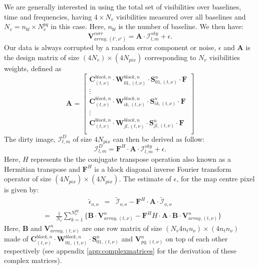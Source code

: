 \documentclass[useAMS,usenatbib]{mn2e}
\begin{document}
We are generally interested in using the total set of visibilities over baselines, time and frequencies, having $4\times N_v$ visibilities 
measured over all baselines  and $N_v=n_{bl}\times N_v^{pq}$ in this case. Here, $n_{bl}$ is the number of baseline. We then have:
\begin{equation}
 \mathbf{V}_{array,(t',\nu')}^{corr}=\mathbf{A}\cdot\mathcal{I}_{l,m}^{sky} + \epsilon. \label{eq:vall}
\end{equation}
Our data is always corrupted by a random error component or noise, $\epsilon$   and $\mathbf{A}$ is the design matrix of size 
$(4N_v)\times (4N_{pix})$ 
corresponding to $N_v$ visibilities weights, defined as
\begin{equation*}
\mathbf{A}_{}=
  \begin{bmatrix}
    \mathbf{C}_{(t,\nu)}^{block,n}\cdot \mathbf{W}_{01,(t,\nu)}^{block,n}\cdot \mathbf{S}_{01,(t,\nu)}^{n} \cdot\mathbf{F}\\
    \vdots\\
    \mathbf{C}_{(t,\nu)}^{block,n}\cdot \mathbf{W}_{ik,(t,\nu)}^{block,n}\cdot \mathbf{S}_{ik,(t,\nu)}^{n} \cdot\mathbf{F}\\
    \vdots \\
    \mathbf{C}_{(t,\nu)}^{block,n}\cdot \mathbf{W}_{jl,(t,\nu)}^{block,n}\cdot \mathbf{S}_{jl,(t,\nu)}^{n} \cdot\mathbf{F}\\
  \end{bmatrix}
\end{equation*}
The dirty image, $\mathcal{I}_{l,m}^{D}$ of size $4N_{pix}$ can then be derived as follow:
\begin{equation}
\mathcal{I}_{l,m}^{D}=\mathbf{F}^{H}\cdot\mathbf{A}\cdot\mathcal{I}_{l,m}^{sky} + \epsilon.
\end{equation}
Here, $H$ represents the the conjugate transpose operation also known as a Hermitian transpose and $\mathbf{F}^{H}$ is a block diagonal
inverse Fourier transform operator of size $(4N_{pix})\times(4N_{pix})$. The estimate of  $\epsilon$, for the map centre pixel is given by:
\begin{eqnarray*}
 \widetilde{\epsilon}_{o,o}&=&\widetilde{\mathcal{I}}_{o,o} - \mathbf{F}^{H}\cdot\mathbf{A}\cdot\widetilde{\mathcal{I}}_{o,o}
\end{eqnarray*}
\begin{eqnarray}
	&=&\frac{1}{N_{v}}\sum_{k=1}^{N_{v}^{pq}}\Bigg\{\mathbf{B}\cdot\mathbf{V}_{array,(t,\nu)}^{n}-
\mathbf{F}^{H}{H}\cdot\mathbf{A}\cdot\mathbf{B}\cdot\mathbf{V}_{array,(t,\nu)}^{n}\Bigg\} \label{eq:noise}
\end{eqnarray}
Here, $\mathbf{B}$ and $\mathbf{V}_{array,(t,\nu)}^{n}$ are  one row matrix of size $(N_v 4 n_t n_{\nu})\times (4 n_t n_{\nu})$ made of 
$\mathbf{C}_{(t,\nu)}^{block,n}\cdot \mathbf{W}_{01,(t,\nu)}^{block,n}\cdot \mathbf{S}_{01,(t,\nu)}^{n}$ and $\mathbf{V}_{pq,(t,\nu)}^{n}$
on top of each other respectively (see appendix \ref{app:complexmatrices} for the derivation of these complex matrices).
\end{document}

